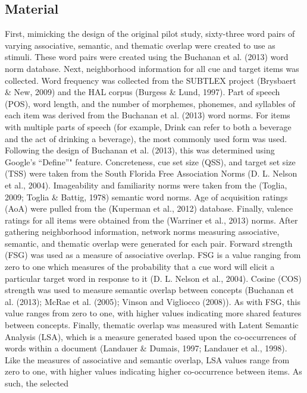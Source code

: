 \documentclass[english,man]{apa6}
\theoremstyle{definition}
\theoremstyle{definition}
\theoremstyle{remark}
\begin{document}
\subsection{Material}\label{material}

First, mimicking the design of the original pilot study, sixty-three
word pairs of varying associative, semantic, and thematic overlap were
created to use as stimuli. These word pairs were created using the
Buchanan et al. (2013) word norm database. Next, neighborhood
information for all cue and target items was collected. Word frequency
was collected from the SUBTLEX project (Brysbaert \& New, 2009) and the
HAL corpus (Burgess \& Lund, 1997). Part of speech (POS), word length,
and the number of morphemes, phonemes, and syllables of each item was
derived from the Buchanan et al. (2013) word norms. For items with
multiple parts of speech (for example, Drink can refer to both a
beverage and the act of drinking a beverage), the most commonly used
form was used. Following the design of Buchanan et al. (2013), this was
determined using Google's \enquote{Define}" feature. Concreteness, cue
set size (QSS), and target set size (TSS) were taken from the South
Florida Free Association Norms (D. L. Nelson et al., 2004). Imageability
and familiarity norms were taken from the (Toglia, 2009; Toglia \&
Battig, 1978) semantic word norms. Age of acquisition ratings (AoA) were
pulled from the (Kuperman et al., 2012) database. Finally, valence
ratings for all items were obtained from the (Warriner et al., 2013)
norms. After gathering neighborhood information, network norms measuring
associative, semantic, and thematic overlap were generated for each
pair. Forward strength (FSG) was used as a measure of associative
overlap. FSG is a value ranging from zero to one which measures of the
probability that a cue word will elicit a particular target word in
response to it (D. L. Nelson et al., 2004). Cosine (COS) strength was
used to measure semantic overlap between concepts (Buchanan et al.
(2013); McRae et al. (2005); Vinson and Vigliocco (2008)). As with FSG,
this value ranges from zero to one, with higher values indicating more
shared features between concepts. Finally, thematic overlap was measured
with Latent Semantic Analysis (LSA), which is a measure generated based
upon the co-occurrences of words within a document (Landauer \& Dumais,
1997; Landauer et al., 1998). Like the measures of associative and
semantic overlap, LSA values range from zero to one, with higher values
indicating higher co-occurrence between items. As such, the selected
\end{document}
